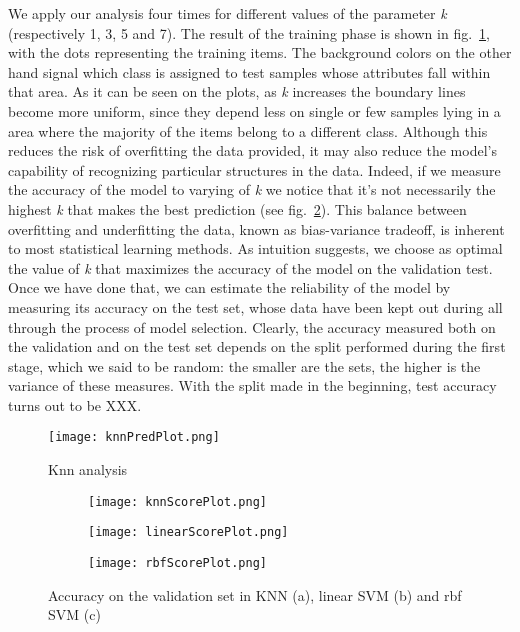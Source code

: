 \documentclass[11pt,twoside,a4paper]{article}
\begin{document}
We apply our analysis four times for different values of the parameter \emph{k} (respectively 1, 3, 5 and 7). The result of the training phase is shown in fig.~\ref{fig:knnPred}, with the dots representing the training items. The background colors on the other hand signal which class is assigned to test samples whose attributes fall within that area. As it can be seen on the plots, as \emph{k} increases the boundary lines become more uniform, since they depend less on single or few samples lying in a area where the majority of the items belong to a different class. Although this reduces the risk of overfitting the data provided, it may also reduce the model's capability of recognizing particular structures in the data.
Indeed, if we measure the accuracy of the model to varying of \emph{k} we notice that it's not necessarily the highest \emph{k} that makes the best prediction (see fig.~\ref{fig:knnScore}). This balance between overfitting and underfitting the data, known as bias-variance tradeoff, is inherent to most statistical learning methods.\newline
As intuition suggests, we choose as optimal the value of \emph{k} that maximizes the accuracy of the model on the validation test. Once we have done that, we can estimate the reliability of the model by measuring its accuracy on the test set, whose data have been kept out during all through the process of model selection. Clearly, the accuracy measured both on the validation and on the test set depends on the split performed during the first stage, which we said to be random: the smaller are the sets, the higher is the variance of these measures. With the split made in the beginning, test accuracy turns out to be XXX.

\begin{figure}[]
  \begin{center}
  \texttt{[image: knnPredPlot.png]}
  \caption{Knn analysis}
  \label{fig:knnPred}
  \end{center}
\end{figure}

\begin{figure}[]
    \centering
    \begin{subfigure}{0.7\textwidth}
	\texttt{[image: knnScorePlot.png]}
        \caption{}
        \label{fig:knnScore}
    \end{subfigure}
    \begin{subfigure}{0.7\textwidth}
	\texttt{[image: linearScorePlot.png]}
        \caption{}
        \label{fig:linearScore}
    \end{subfigure}
    \begin{subfigure}{0.7\textwidth}
        \texttt{[image: rbfScorePlot.png]}
        \caption{}
        \label{fig:rbfScore}
    \end{subfigure}%
    \caption{Accuracy on the validation set in KNN (a), linear SVM (b) and rbf SVM (c)}
\end{figure}
\end{document}
